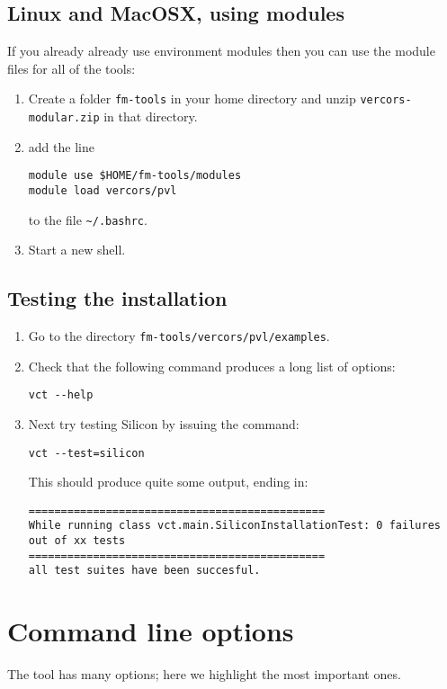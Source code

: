 \subsection{Linux and MacOSX, using modules}

If you already already use environment modules then you can use
the module files for all of the tools:

\begin{enumerate}
\item Create a folder \verb+fm-tools+ in your home directory and unzip \verb+vercors-modular.zip+
in that directory.
\item add the line
\begin{verbatim}
module use $HOME/fm-tools/modules
module load vercors/pvl
\end{verbatim}
to the file \verb+~/.bashrc+.
\item Start a new shell.
\end{enumerate}


\subsection{Testing the installation}

\begin{enumerate}
\item Go to the directory \verb+fm-tools/vercors/pvl/examples+.
\item Check that the following command produces a long list of options:
\begin{verbatim}
vct --help
\end{verbatim}
\item Next try testing Silicon by issuing the command:
\begin{verbatim}
vct --test=silicon
\end{verbatim}
This should produce quite some output, ending in:
\begin{verbatim}
==============================================
While running class vct.main.SiliconInstallationTest: 0 failures out of xx tests
==============================================
all test suites have been succesful.
\end{verbatim}
\end{enumerate}


\section{Command line options}

The tool has many options; here we highlight the most important ones.

